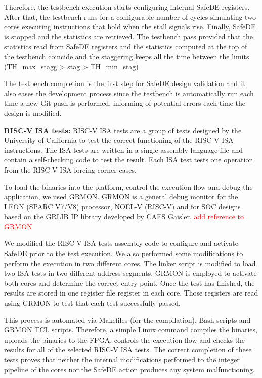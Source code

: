 Therefore, the testbench execution starts configuring internal SafeDE registers. After that, the testbench runs for a configurable number of cycles simulating two cores executing instructions that hold when the stall signals rise. Finally, SafeDE is stopped and the statistics are retrieved. The testbench pass provided that the statistics read from SafeDE registers and the statistics computed at the top of the testbench coincide and the staggering keeps all the time between the limits (TH\_max\_stagg > stag > TH\_min\_stag)

The testbench completion is the first step for SafeDE design validation and it also eases the development process since the testbench is automatically run each time a new Git push is performed, informing of potential errors each time the design is modified.



\textbf{RISC-V ISA tests:} RISC-V ISA tests \cite{ISAtests} are a group of tests designed by the University of California to test the correct functioning of the RISC-V ISA instructions. The ISA tests are written in a single assembly language file and contain a self-checking code to test the result. Each ISA test tests one operation from the RISC-V ISA forcing corner cases. 

To load the binaries into the platform, control the execution flow and debug the application, we used GRMON. GRMON is a general debug monitor for the LEON (SPARC V7/V8) processor, NOEL-V (RISC-V) and for SOC designs based on the GRLIB IP library developed by CAES Gaisler. 
\textcolor{red}{add reference to GRMON} 

We modified the RISC-V ISA tests assembly code to configure and activate SafeDE prior to the test execution. We also performed some modifications to perform the execution in two different cores. The linker script is modified to load two ISA tests in two different address segments. GRMON is employed to activate both cores and determine the correct entry point. Once the test has finished, the results are stored in one register file register in each core. Those registers are read using GRMON to test that each test successfully passed. 

This process is automated via Makefiles (for the compilation), Bash scripts and GRMON TCL scripts. Therefore, a simple Linux command compiles the binaries, uploads the binaries to the FPGA, controls the execution flow and checks the results for all of the selected RISC-V ISA tests. The correct completion of these tests proves that neither the internal modifications performed to the integer pipeline of the cores nor the SafeDE action produces any system malfunctioning.

